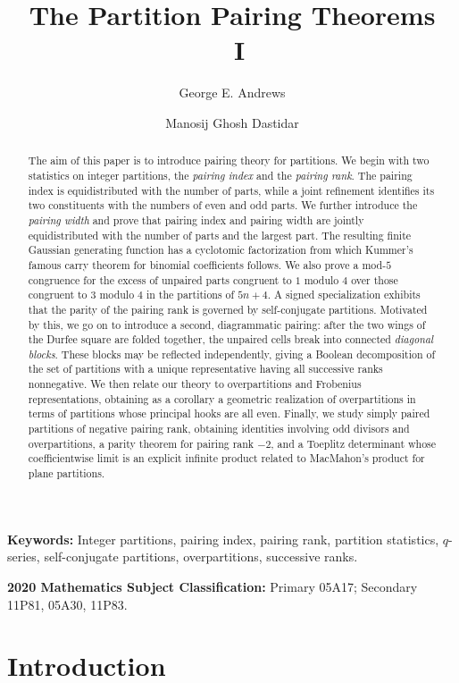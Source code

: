 \documentclass[11pt]{article}
\title{The Partition Pairing Theorems\\\ I}
\author{George E. Andrews \and Manosij Ghosh Dastidar}
\date{}
\theoremstyle{definition}
\theoremstyle{remark}
\begin{document}
\maketitle

\begin{abstract}
The aim of this paper is to introduce pairing theory for partitions. We begin with two statistics on integer partitions, the \emph{pairing index} and the \emph{pairing rank}.  The pairing index is equidistributed with the number of parts, while a joint refinement identifies its two constituents with the numbers of even and odd parts.  We further introduce the \emph{pairing width} and prove that pairing index and pairing width are jointly equidistributed with the number of parts and the largest part.  The resulting finite Gaussian generating function has a cyclotomic factorization from which Kummer's famous carry theorem for binomial coefficients follows.  We also prove a mod-$5$ congruence for the excess of unpaired parts congruent to $1$ modulo $4$ over those congruent to $3$ modulo $4$ in the partitions of $5n+4$.  A signed specialization exhibits that the parity of the pairing rank is governed by self-conjugate partitions.  Motivated by this, we go on to introduce a second, diagrammatic pairing: after the two wings of the Durfee square are folded together, the unpaired cells break into connected \emph{diagonal blocks}.  These blocks may be reflected independently, giving a Boolean decomposition of the set of partitions with a unique representative having all successive ranks nonnegative.  
We then relate our theory to overpartitions and Frobenius representations, obtaining as a corollary a geometric realization of overpartitions in terms of partitions whose principal hooks are all even.  Finally, we study simply paired partitions of negative pairing rank, obtaining identities involving odd divisors and overpartitions, a parity theorem for pairing rank $-2$, and a Toeplitz determinant whose coefficientwise limit is an explicit infinite product related to MacMahon's product for plane partitions.
\end{abstract}


\noindent\textbf{Keywords:}
Integer partitions, pairing index, pairing rank, partition statistics,
$q$-series, self-conjugate partitions, overpartitions, successive ranks.

\medskip
\noindent\textbf{2020 Mathematics Subject Classification:}
Primary 05A17; Secondary 11P81, 05A30, 11P83.

\section{Introduction}
\end{document}
